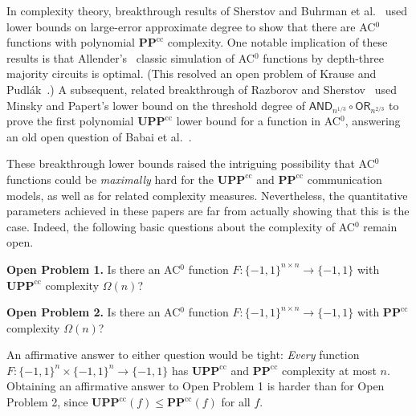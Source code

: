 \documentclass{toc}
\newcommand{\OR}{\mathsf{ OR}}
\newcommand{\bits}{\{-1,1\}}
\newcommand{\PP}{\mathbf{PP}}
\newcommand{\UPP}{\mathbf{UPP}}
\newcommand{\UPPcc}{\mathbf{UPP}^{\text{cc}}}
\newcommand{\AND}{\mathsf{AND}}
\begin{document}
In complexity theory, breakthrough results
of Sherstov \cite{sherstovmajmaj, patmat} and Buhrman et al.~\cite{bvdw}
used lower bounds on large-error approximate degree
to show that there are AC$^0$ functions with polynomial $\PP^{\text{cc}}$
complexity. 
One notable implication  of these results is that Allender's~\cite{allender} classic simulation
of AC$^0$ functions by depth-three majority circuits is optimal. (This resolved an open problem of Krause and Pudl{\'{a}}k~\cite{kp}.)
A subsequent, related breakthrough of Razborov and Sherstov~\cite{razborovsherstov} used Minsky and Papert's lower bound 
on the threshold degree of $\AND_{n^{1/3}} \circ \OR_{n^{2/3}}$ to prove the first polynomial $\UPPcc$
lower bound for a function in AC$^0$, answering an old open question of Babai et al.~\cite{babaietal}. 

\medskip

These breakthrough  lower bounds raised the intriguing possibility that AC$^0$ functions could be \emph{maximally} hard for
the $\UPP^{\text{cc}}$ and $\PP^{\text{cc}}$ communication models, as well as for related complexity measures. Nevertheless, the quantitative parameters achieved in these %
papers   %
are far from actually showing that this is the case. Indeed, the following basic questions about the complexity of AC$^0$ remain open.

\label{s:openproblem1}

\medskip \noindent \textbf{Open Problem 1.} Is there an AC$^0$ function $F \colon \bits^{n \times n} \to \bits$  with 
$\UPP^{\text{cc}}$ complexity $\Omega(n)$?

\medskip \noindent \textbf{Open Problem 2.} Is there an AC$^0$ function $F \colon \bits^{n \times n} \to \bits$  with 
$\PP^{\text{cc}}$ complexity  $\Omega(n)$?

\medskip 
An affirmative answer to either question would be tight: \emph{Every} function $F \colon \bits^n \times \bits^n \to \bits$
has  $\UPP^{\text{cc}}$ and  $\PP^{\text{cc}}$ complexity at most $n$. %
Obtaining an affirmative answer to Open Problem 1 is
harder than for Open Problem 2, since $\UPP^{\text{cc}}(f) \leq \PP^{\text{cc}}(f)$ for all $f$. 
\end{document}
